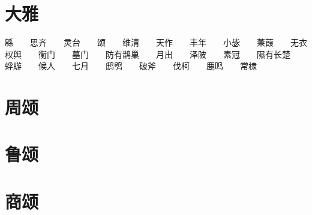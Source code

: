 \documentclass[12pt,UTF8]{ctexbook}
\begin{document}
\part{大雅}
緜　　思齐　　灵台　　颂　　维清　　天作　　丰年　　小毖　　蒹葭　　无衣　　权舆　　衡门　　墓门　　防有鹊巢　　月出　　泽陂　　素冠　　隰有长楚　　蜉蝣　　候人　　七月　　鸱鸮　　破斧　　伐柯　　鹿鸣　　常棣
\part{周颂}

\part{鲁颂}

\part{商颂}

\backmatter
\end{document}
